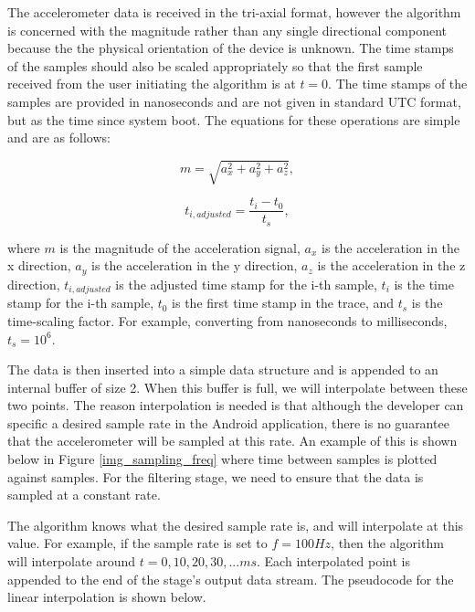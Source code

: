             The accelerometer data is received in the tri-axial format, however the algorithm is concerned with the magnitude rather than any single directional component because the the physical orientation of the device is unknown. The time stamps of the samples should also be scaled appropriately so that the first sample received from the user initiating the algorithm is at $t = 0$. The time stamps of the samples are provided in nanoseconds and are not given in standard UTC format, but as the time since system boot. The equations for these operations are simple and are as follows:

            \begin{equation}
                m = \sqrt{a_{x}^2 + a_{y}^2 + a_{z}^2},
            \end{equation}

            \begin{equation}
                t_{i,adjusted} = \frac{t_i - t_0}{t_s},
            \end{equation}

            where $m$ is the magnitude of the acceleration signal, $a_{x}$ is the acceleration in the x direction, $a_{y}$ is the acceleration in the y direction, $a_{z}$ is the acceleration in the z direction, $t_{i,adjusted}$ is the adjusted time stamp for the i-th sample, $t_i$ is the time stamp for the i-th sample, $t_0$ is the first time stamp in the trace, and $t_s$ is the time-scaling factor. For example, converting from nanoseconds to milliseconds, $t_s = 10^6$. 

            The data is then inserted into a simple data structure and is appended to an internal buffer of size 2. When this buffer is full, we will interpolate between these two points. The reason interpolation is needed is that although the developer can specific a desired sample rate in the Android application, there is no guarantee that the accelerometer will be sampled at this rate. An example of this is shown below in Figure \ref{img_sampling_freq} where time between samples is plotted against samples. For the filtering stage, we need to ensure that the data is sampled at a constant rate.

            The algorithm knows what the desired sample rate is, and will interpolate at this value. For example, if the sample rate is set to $f = 100 Hz$, then the algorithm will interpolate around $t = 0, 10, 20, 30, ... ms$. Each interpolated point is appended to the end of the stage's output data stream. The pseudocode for the linear interpolation is shown below.

